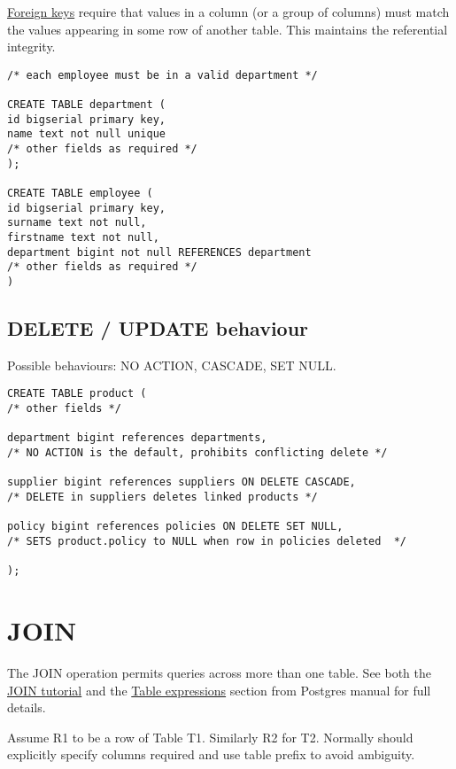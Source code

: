 \documentclass[slides]{pgnotes}
\begin{document}
\href{https://www.postgresql.org/docs/13/ddl-constraints.html\#DDL-CONSTRAINTS-FK}{Foreign
keys} require that values in a column (or a group of columns) must match
the values appearing in some row of another table. This maintains the
referential integrity.

\begin{verbatim}
/* each employee must be in a valid department */

CREATE TABLE department (
id bigserial primary key,
name text not null unique
/* other fields as required */
);

CREATE TABLE employee (
id bigserial primary key,
surname text not null,
firstname text not null,
department bigint not null REFERENCES department
/* other fields as required */
)
\end{verbatim}

\subsection{DELETE / UPDATE behaviour}\label{delete-update-behaviour}

Possible behaviours: NO ACTION, CASCADE, SET NULL.

\begin{verbatim}
CREATE TABLE product ( 
/* other fields */

department bigint references departments, 
/* NO ACTION is the default, prohibits conflicting delete */

supplier bigint references suppliers ON DELETE CASCADE,
/* DELETE in suppliers deletes linked products */

policy bigint references policies ON DELETE SET NULL,
/* SETS product.policy to NULL when row in policies deleted  */

);
\end{verbatim}

\section{JOIN}\label{join}

The JOIN operation permits queries across more than one table. See both
the
\href{https://www.postgresql.org/docs/current/tutorial-join.html}{JOIN
tutorial} and the
\href{https://www.postgresql.org/docs/13/queries-table-expressions.html}{Table
expressions} section from Postgres manual for full details.

Assume R1 to be a row of Table T1. Similarly R2 for T2. Normally should
explicitly specify columns required and use table prefix to avoid
ambiguity.
\end{document}
